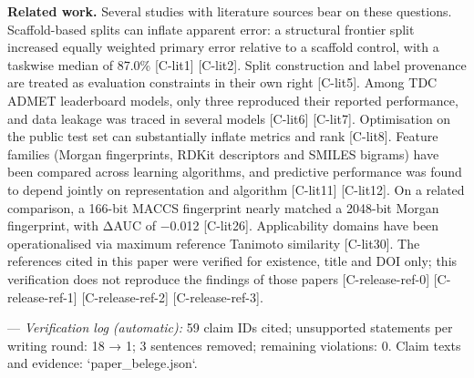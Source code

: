 \documentclass[10pt,twocolumn]{article}
\begin{document}
\textbf{Related work.} Several studies with literature sources bear on these questions. Scaffold-based splits can inflate apparent error: a structural frontier split increased equally weighted primary error relative to a scaffold control, with a taskwise median of 87.0\% {\scriptsize[C-lit1]} {\scriptsize[C-lit2]}. Split construction and label provenance are treated as evaluation constraints in their own right {\scriptsize[C-lit5]}. Among TDC ADMET leaderboard models, only three reproduced their reported performance, and data leakage was traced in several models {\scriptsize[C-lit6]} {\scriptsize[C-lit7]}. Optimisation on the public test set can substantially inflate metrics and rank {\scriptsize[C-lit8]}. Feature families (Morgan fingerprints, RDKit descriptors and SMILES bigrams) have been compared across learning algorithms, and predictive performance was found to depend jointly on representation and algorithm {\scriptsize[C-lit11]} {\scriptsize[C-lit12]}. On a related comparison, a 166-bit MACCS fingerprint nearly matched a 2048-bit Morgan fingerprint, with ΔAUC of −0.012 {\scriptsize[C-lit26]}. Applicability domains have been operationalised via maximum reference Tanimoto similarity {\scriptsize[C-lit30]}. The references cited in this paper were verified for existence, title and DOI only; this verification does not reproduce the findings of those papers {\scriptsize[C-release-ref-0]} {\scriptsize[C-release-ref-1]} {\scriptsize[C-release-ref-2]} {\scriptsize[C-release-ref-3]}.

---
\emph{Verification log (automatic):} 59 claim IDs cited; unsupported statements per writing round: 18 → 1; 3 sentences removed; remaining violations: 0. Claim texts and evidence: `paper_belege.json`.
\end{document}
